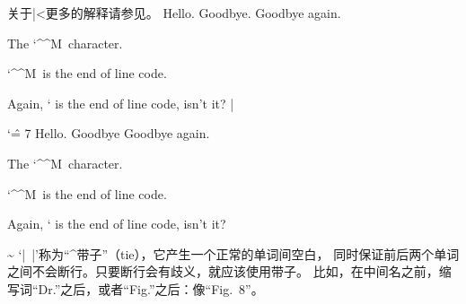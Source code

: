 关于|^^|更多的解释请参见。
\example
Hello.^^MGoodbye.
Goodbye again.\par
The \char `\^^M\ character.\par
\number `\^^M\ is the end of line code.\par
Again, \number `^^M is the end of line code,
isn't it? %
|
\produces
{\catcode `\^ = 7 %
Hello.^^MGoodbye
Goodbye again.\par
The \char `\^^M\ character.\par
\number `\^^M\ is the end of line code.\par
Again, \number `^^M is the end of line code,
isn't it?}
\endexample
\enddesc

%


\begindesc
\easy\ctsact \~ 
\explain
{}`|~|'称为``^{带子}''（tie），它产生一个正常的单词间空白，
同时保证前后两个单词之间不会断行。只要断行会有歧义，就应该使用带子。
比如，在中间名之前，缩写词``Dr.''之后，或者``Fig.''之后：像``Fig.~8''。

